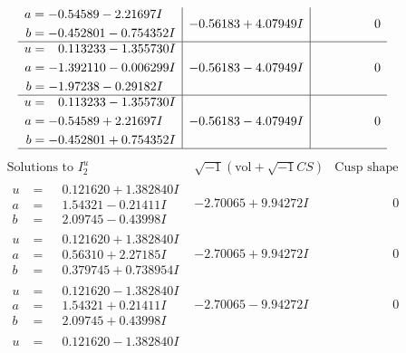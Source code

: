 \documentclass[1p]{elsarticle_modified}
\theoremstyle{definition}
\newcommand{\I}{\sqrt{-1}}
\begin{document}
$$\begin{array}{c|c|c}
\begin{aligned}
a &= -0.54589 - 2.21697 I \\
b &= -0.452801 - 0.754352 I\end{aligned}
 & -0.56183 + 4.07949 I & \phantom{-0.000000 } 0 \\ \hline\begin{aligned}
u &= \phantom{-}0.113233 - 1.355730 I \\
a &= -1.392110 - 0.006299 I \\
b &= -1.97238 - 0.29182 I\end{aligned}
 & -0.56183 - 4.07949 I & \phantom{-0.000000 } 0 \\ \hline\begin{aligned}
u &= \phantom{-}0.113233 - 1.355730 I \\
a &= -0.54589 + 2.21697 I \\
b &= -0.452801 + 0.754352 I\end{aligned}
 & -0.56183 - 4.07949 I & \phantom{-0.000000 } 0\\
 \hline 
 \end{array}$$\newpage$$\begin{array}{c|c|c}  
\text{Solutions to }I^u_{2}& \I (\text{vol} + \sqrt{-1}CS) & \text{Cusp shape}\\
 \hline 
\begin{aligned}
u &= \phantom{-}0.121620 + 1.382840 I \\
a &= \phantom{-}1.54321 - 0.21411 I \\
b &= \phantom{-}2.09745 - 0.43998 I\end{aligned}
 & -2.70065 + 9.94272 I & \phantom{-0.000000 } 0 \\ \hline\begin{aligned}
u &= \phantom{-}0.121620 + 1.382840 I \\
a &= \phantom{-}0.56310 + 2.27185 I \\
b &= \phantom{-}0.379745 + 0.738954 I\end{aligned}
 & -2.70065 + 9.94272 I & \phantom{-0.000000 } 0 \\ \hline\begin{aligned}
u &= \phantom{-}0.121620 - 1.382840 I \\
a &= \phantom{-}1.54321 + 0.21411 I \\
b &= \phantom{-}2.09745 + 0.43998 I\end{aligned}
 & -2.70065 - 9.94272 I & \phantom{-0.000000 } 0 \\ \hline\begin{aligned}
u &= \phantom{-}0.121620 - 1.382840 I \\

\end{aligned}
\end{array}$$
\end{document}
